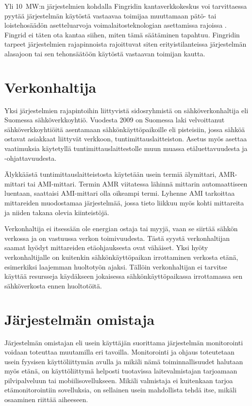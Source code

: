   Yli \SI{10}{\mega\watt}:n järjestelmien kohdalla Fingridin kantaverkkokeskus voi tarvittaessa pyytää järjestelmän käytöstä vastaavaa toimijaa muuttamaan pätö- tai loistehosäädön asetteluarvoja voimalaitosteknologian asettamissa rajoissa \parencite{VJV2018}. Fingrid ei täten ota kantaa siihen, miten tämä säätäminen tapahtuu. Fingridin tarpeet järjestelmien rajapinnoista rajoittuvat siten erityistilanteissa järjestelmän alasajoon tai sen tehonsäätöön käytöstä vastaavan toimijan kautta.

\section{Verkonhaltija}

  Yksi järjestelmien rajapintoihin liittyvistä sidosryhmistä on sähköverkonhaltija eli Suomessa sähköverkkoyhtiö. Vuodesta 2009 on Suomessa laki velvoittanut sähköverkkoyhtiöitä asentamaan sähkönkäyttöpaikoille eli pisteisiin, jossa sähköä ostavat asiakkaat liittyvät verkkoon, tuntimittauslaitteiston. Asetus myös asettaa vaatimuksia käytetyllä tuntimittauslaittestolle muun muassa etäluettavuudesta ja -ohjattavuudesta. \parencite{mittariAsetus}

  Älykkäästä tuntimittauslaitteistosta käytetään usein termiä älymittari, \gls{AMR}-mittari tai \gls{AMI}-mittari. Termin \gls{AMR} viitatessa lähinnä mittarin automaattiseen luentaan, saattaisi \gls{AMI}-mittari olla oikeampi termi. Lyhenne \gls{AMI} tarkoittaa mittareiden muodostamaa järjestelmää, jossa tieto liikkuu myös kohti mittareita ja niiden takana olevia kiinteistöjä. \parencite{dictOfEnergy}

  Verkonhaltija ei itsessään ole energian ostaja tai myyjä, vaan se siirtää sähkön verkossa ja on vastuussa verkon toimivuudesta. Tästä syystä verkonhaltijan saamat hyödyt mittareiden etäohjauksesta ovat vähäiset. Yksi hyöty verkonhaltijalle on kuitenkin sähkönkäyttöpaikan irrottaminen verkosta etänä, esimerkiksi laajemman huoltotyön ajaksi. Tällöin verkonhaltijan ei tarvitse käyttää resursseja käydäkseen jokaisessa sähkönkäyttöpaikassa irrottamassa sen sähköverkosta ennen huoltotöitä.

\section{Järjestelmän omistaja}

  Järjestelmän omistajan eli usein käyttäjän suorittama järjestelmän monitorointi voidaan toteuttaa muutamilla eri tavoilla. Monitorointi ja ohjaus toteutetaan usein fyysisen käyttöliittymän avulla ja mikäli nämä toiminnallisuudet halutaan myös etänä, on käyttöliittymä helposti tuotavissa laitevalmistajan tarjoamaan pilvipalveluun tai mobiilisovellukseen. Mikäli valmistaja ei kuitenkaan tarjoa etämonitorointiin sovelluksia, on sellainen usein mahdollista tehdä itse, mikäli osaaminen riittää aiheeseen.

